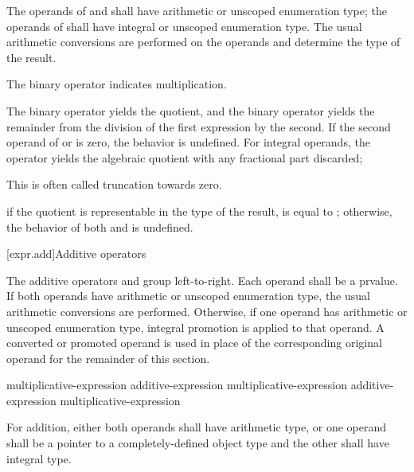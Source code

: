\pnum
The operands of \tcode{*} and \tcode{/} shall have arithmetic or unscoped
enumeration type; the operands of \tcode{\%} shall have integral or unscoped
enumeration type. The usual arithmetic conversions are performed on the
operands and determine the type of the result.

\pnum
The binary \tcode{*} operator indicates multiplication.

\pnum
The binary \tcode{/} operator yields the quotient, and the binary
\tcode{\%} operator yields the remainder from the division of the first
expression by the second.
%
If the second operand of \tcode{/} or \tcode{\%} is zero, the behavior is
undefined.
For integral operands, the \tcode{/} operator yields the algebraic quotient with
any fractional part discarded;
\begin{footnote}
This is often called truncation towards zero.
\end{footnote}
if the quotient  is representable in the type of the result,
 is equal to ; otherwise, the behavior
of both  and  is undefined.

[expr.add]{Additive operators}%
%

\pnum
The additive operators \tcode{+} and \tcode{-} group left-to-right.
Each operand shall be a prvalue.
If both operands have arithmetic or unscoped enumeration type,
the usual arithmetic conversions are performed.
Otherwise, if one operand has arithmetic or unscoped enumeration type,
integral promotion is applied to that operand.
A converted or promoted operand is used in place of
the corresponding original operand for the remainder of this section.

%
%
%
%
%
%
%
\begin{bnf}
\br
    multiplicative-expression\br
    additive-expression \terminal{+} multiplicative-expression\br
    additive-expression \terminal{-} multiplicative-expression
\end{bnf}

%
For addition, either both operands shall have arithmetic
type, or one operand shall be a pointer to a completely-defined object
type and the other shall have integral type.

